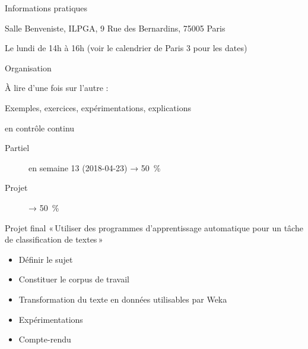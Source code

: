 \documentclass[hyperref={unicode}, xcolor={svgnames}, french]{beamer}
\title{\titlepagetitle}
\author{\textbf{\myname} (\mylab)}
\institute{}
\date{\conference\\\docdate}
\begin{document}

\begin{frame}[plain]
	\titlepage
\end{frame}

\begin{frame}{Informations pratiques}
    \begin{description}[*]
        \item[Où] Salle Benveniste, ILPGA, 9 Rue des Bernardins, 75005 Paris
        \item[Quand] Le lundi de 14h à 16h (voir le calendrier de Paris 3 pour les dates)
        \item[Contact] 
        \item[Web] {}
    \end{description}
\end{frame}

\begin{frame}{Organisation}
    \begin{description}[*]
        \item[Poly] À lire d'une fois sur l'autre :\\
                    {\footnotesize{}}
        \item[Cours] Exemples, exercices, expérimentations, explications
        \item[Évaluation] en contrôle continu
            \begin{description}
                \item[Partiel] en semaine 13 (2018-04-23) → \SI{50}{\percent}
                \item[Projet] → \SI{50}{\percent}
            \end{description}
    \end{description}
\end{frame}

\begin{frame}{Projet final}
    « Utiliser des programmes d'apprentissage automatique pour un tâche de classification de textes »
    \begin{itemize}
        \item Définir le sujet
        \item Constituer le corpus de travail
        \item Transformation du texte en données utilisables par Weka
        \item Expérimentations
        \item Compte-rendu
    \end{itemize}
\end{frame}
\end{document}
